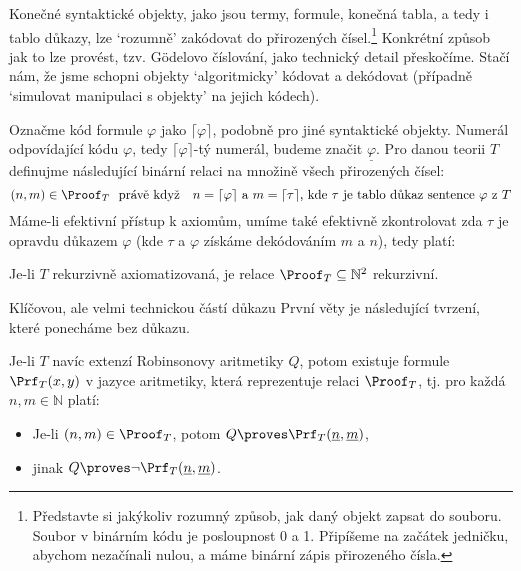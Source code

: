 Konečné syntaktické objekty, jako jsou termy, formule, konečná tabla, a tedy i tablo důkazy, lze `rozumně' zakódovat do přirozených čísel.\footnote{Představte si jakýkoliv rozumný způsob, jak daný objekt zapsat do souboru. Soubor v binárním kódu je posloupnost 0 a 1. Připíšeme na začátek jedničku, abychom nezačínali nulou, a máme binární zápis přirozeného čísla.} Konkrétní způsob jak to lze provést, tzv. \alert{Gödelovo číslování}, jako technický detail přeskočíme. Stačí nám, že jsme schopni objekty `algoritmicky' kódovat a dekódovat (případně `simulovat manipulaci s objekty' na jejich kódech).

Označme kód formule $\varphi$ jako $\lceil\varphi\rceil$, podobně pro jiné syntaktické objekty. Numerál odpovídající kódu $\varphi$, tedy $\lceil\varphi\rceil$-tý numerál, budeme značit $\underline{\varphi}$. Pro danou teorii $T$ definujme následující binární relaci na množině všech přirozených čísel:
$$
(n,m)\in\Proof_T\ \text{ právě když \ \ $n=\lceil\varphi\rceil$ a $m=\lceil\tau\rceil$, kde $\tau$ je tablo důkaz sentence $\varphi$ z $T$}
$$
Máme-li efektivní přístup k axiomům, umíme také efektivně zkontrolovat zda $\tau$ je opravdu důkazem $\varphi$ (kde $\tau$ a $\varphi$ získáme dekódováním $m$ a $n$), tedy platí:
\begin{observation}
Je-li $T$ rekurzivně axiomatizovaná, je relace $\Proof_T\subseteq\mathbb N^2$ \alert{rekurzivní}. 
\end{observation}

Klíčovou, ale velmi technickou částí důkazu První věty je následující tvrzení, které ponecháme bez důkazu.

\begin{proposition}
Je-li $T$ navíc extenzí Robinsonovy aritmetiky $Q$, potom existuje formule $\Prf_T(x,y)$ v jazyce aritmetiky, která \alert{reprezentuje} relaci $\Proof_T$, tj. pro každá $n,m\in\mathbb N$ platí:
\begin{itemize}
    \item Je-li $(n,m)\in\Proof_T$, potom $Q\proves\Prf_T(\underline{n},\underline{m})$,
    \item jinak $Q\proves\neg\Prf_T(\underline{n},\underline{m})$.
\end{itemize} 
\end{proposition}

